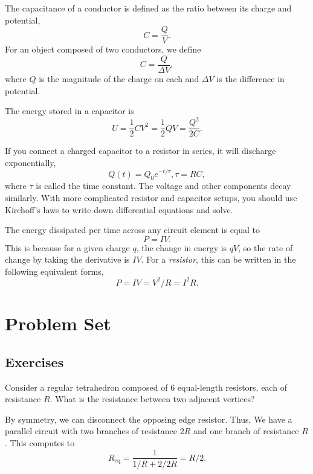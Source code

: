 \documentclass[11pt]{scrartcl}
\begin{document}
\begin{defn}[Capacitors]
    The capacitance of a conductor is defined as the ratio between its charge and potential, $$C = \frac QV.$$ For an object composed of two conductors, we define $$C = \frac{Q}{\Delta V},$$where $Q$ is the magnitude of the charge on each and $\Delta V$ is the difference in potential.
\end{defn}

\begin{idea}
    The energy stored in a capacitor is
    $$U = \frac 12 CV^2 = \frac 12 QV = \frac{Q^2}{2C}.$$
\end{idea}

\begin{idea}[RC Circuits]
    If you connect a charged capacitor to a resistor in series, it will discharge exponentially, $$Q(t) = Q_0 e^{-t/\tau}, \tau = RC,$$ where $\tau$ is called the time constant. The voltage and other components decay similarly. With more complicated resistor and capacitor setups, you should use Kirchoff's laws to write down differential equations and solve.
\end{idea}

\begin{idea}[Power]
    The energy dissipated per time across any circuit element is equal to
    $$P = IV.$$
    This is because for a given charge $q$, the change in energy is $qV$, so the rate of change by taking the derivative is $IV$. For a \textit{resistor}, this can be written in the following equivalent forms,
    $$P = IV = V^2/R = I^2R.$$
\end{idea}

\section{Problem Set}

\subsection{Exercises}

\begin{prob}
    Consider a regular tetrahedron composed of 6 equal-length resistors, each of resistance $R$. What is the resistance between two adjacent vertices?
\end{prob}

\begin{sol}
    By symmetry, we can disconnect the opposing edge resistor. Thus, We have a parallel circuit with two branches of resistance $2R$ and one branch of resistance $R$. This computes to
    $$R_{\text{eq}} = \frac{1}{1/R + 2/2R} = \boxed{R/2}.$$
\end{sol}
\end{document}
